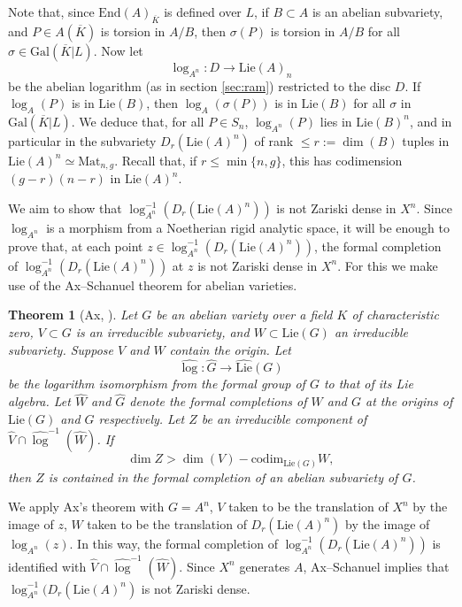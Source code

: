\documentclass[11pt]{amsart}
\newcommand{\codim}{\mathrm{codim}}
\newcommand{\Lie}{\mathrm{Lie}}
\newcommand{\End}{\mathrm{End}}
\theoremstyle{plain}
\newtheorem{theorem}{Theorem}
\theoremstyle{definition}
\newcommand{\Gal}{\mathrm{Gal}}
\newcommand{\Mat}{\mathrm{Mat}}
\begin{document}
Note that, since $\End (A)_{\overline{K}}$ is defined over $L$, if $B\subset A$ is an abelian subvariety, and $P\in A(\overline{K})$ is torsion in $A/B$, then $\sigma (P)$ is torsion in $A/B$ for all $\sigma \in \Gal (\overline{K}|L)$. Now let 
\[
\log _{A^n} :D\to \Lie (A)_n
\]
be the abelian logarithm (as in section \ref{sec:ram}) restricted to the disc $D$. If $\log _A (P)$ is in $\Lie (B)$, then $\log _A (\sigma (P))$ is in $\Lie (B)$ for all $\sigma $ in $\Gal (\overline{K}|L)$. We deduce that, for all $P\in S_n $, $\log _{A^n }(P)$ lies in $\Lie (B)^n$, and in particular in the subvariety $D_r (\Lie (A)^n )$ of rank $\leq r:=\dim (B)$ tuples in $\Lie (A)^n \simeq \Mat _{n,g}$. Recall that, if $r\leq \min \{n,g \}$, this has codimension $(g-r)(n-r)$ in $\Lie (A)^n $.

We aim to show that $\log _{A^n }^{-1}(D_r (\Lie (A)^n ))$ is not Zariski dense in $X^n$. Since $\log _{A^n }$ is a morphism from a Noetherian rigid analytic space, it will be enough to prove that, at each point $z\in \log _{A^n }^{-1}(D_r (\Lie (A)^n ))$, the formal completion of  $\log _{A^n }^{-1}(D_r (\Lie (A)^n ))$ at $z$ is not Zariski dense in $X^n$. For this we make use of the Ax--Schanuel theorem for abelian varieties.
\begin{theorem}[Ax, \cite{ax1972some}]\label{thm:ax}
Let $G$ be an abelian variety over a field $K$ of characteristic zero, $V\subset G$ is an irreducible subvariety, and $W\subset \Lie (G)$ an irreducible subvariety. Suppose $V$ and $W$ contain the origin. Let 
\[
\widehat{\log }:\widehat{G}\to \widehat{\Lie }(G)
\]
be the logarithm isomorphism from the formal group of $G$ to that of its Lie algebra. Let $\widehat{W}$ and $\widehat{G}$ denote the formal completions of $W$ and $G$ at the origins of $\Lie (G)$ and $G$ respectively. Let $Z$ be an irreducible component of $\widehat{V} \cap \widehat{\log }^{-1}(\widehat{W})$. If
\[
\dim Z > \dim (V)-\codim _{\Lie (G)}W,
\]
then $Z$ is contained in the formal completion of an abelian subvariety of $G$.
\end{theorem}
We apply Ax's theorem with $G=A^n$, $V$ taken to be the translation of $X^n$ by the image of $z$, $W$ taken to be the translation of $D_r (\Lie (A)^n )$ by the image of $\log _{A^n }(z)$. In this way, the formal completion of $\log _{A^n }^{-1}(D_r (\Lie (A)^n ))$ is identified with $\widehat{V}\cap \widehat{\log }^{-1}(\widehat{W})$. Since $X^n $ generates $A$, Ax--Schanuel implies that $\log _{A^n}^{-1}(D_r (\Lie (A)^n )$ is not Zariski dense.
%
\end{document}
